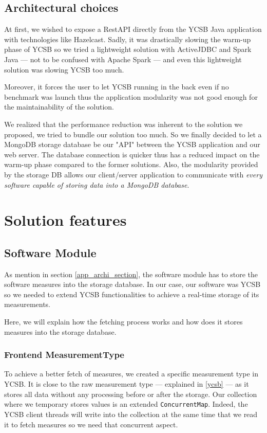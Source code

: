 \documentclass[a4paper,11pt]{report}
\begin{document}
\subsection{Architectural choices}

At first, we wished to expose a RestAPI directly from the YCSB Java application with technologies like Hazelcast. Sadly, it was drastically slowing the warm-up phase of YCSB so we tried a lightweight solution with ActiveJDBC and Spark Java --- not to be confused with Apache Spark --- and even this lightweight solution was slowing YCSB too much. 

Moreover, it forces the user to let YCSB running in the back even if no benchmark was launch thus the application modularity was not good enough for the maintainability of the solution. 

We realized that the performance reduction was inherent to the solution we proposed, we tried to bundle our solution too much. So we finally decided to let a MongoDB storage database be our "API" between the YCSB application and our web server. The database connection is quicker thus has a reduced impact on the warm-up phase compared to the former solutions. Also, the modularity provided by the storage DB allows our client/server application to communicate with \textit{every software capable of storing data into a MongoDB database}.

\section{Solution features}\label{technical_description}

\subsection{Software Module}

As mention in section \ref{app_archi_section}, the software module has to store the software measures into the storage database. In our case, our software was YCSB so we needed to extend YCSB functionalities to achieve a real-time storage of its measurements. 

Here, we will explain how the fetching process works and how does it stores measures into the storage database.

\subsubsection{Frontend MeasurementType}\label{concurrent_map_explainations} To achieve a better fetch of measures, we created a specific measurement type in YCSB. It is close to the raw measurement type --- explained in \ref{ycsb} --- as it stores all data without any processing before or after the storage. Our collection where we temporary stores values is an extended \texttt{ConcurrentMap}. Indeed, the YCSB client threads will write into the collection at the same time that we read it to fetch measures so we need that concurrent aspect.
\end{document}
